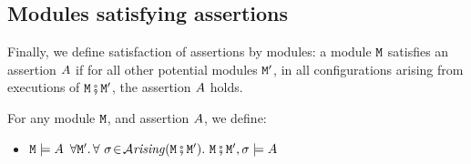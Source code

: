 \subsection{Modules satisfying assertions}

Finally, we define satisfaction of assertions by modules: a module
${\mbox{\tt{\ensuremath{{\mbox{\tt{M}}}}}}}$ satisfies an assertion $A$ if for all other potential modules ${\mbox{\tt{\ensuremath{{\mbox{\tt{M}}}}}}}'$, in all configurations arising from executions of ${\mbox{\tt{\ensuremath{{\mbox{\tt{M}}}}}}}\fatsemi{\mbox{\tt{\ensuremath{{\mbox{\tt{M}}}}}}}'$, the assertion $A$ holds.

\begin{definition}
\label{def:module_satisfies}
For any module ${\mbox{\tt{\ensuremath{{\mbox{\tt{M}}}}}}}$, and  assertion $A$, we define:
\begin{itemize}
\item
${\mbox{\tt{\ensuremath{{\mbox{\tt{M}}}}}}} \models A$ \IFF  $\forall \M'.\, \forall \ \sigma\!\in\!\Arising{\M\mkpair\M'}.\   \M\mkpair\M', \sigma \models \A$
\end{itemize}
\end{definition}


 




